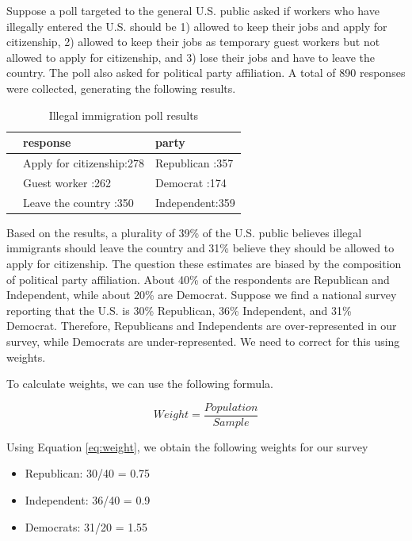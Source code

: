 \documentclass[
]{book}
\providecommand{\tightlist}{%
  \setlength{\itemsep}{0pt}\setlength{\parskip}{0pt}}
\begin{document}
Suppose a poll targeted to the general U.S. public asked if workers who have illegally entered the U.S. should be 1) allowed to keep their jobs and apply for citizenship, 2) allowed to keep their jobs as temporary guest workers but not allowed to apply for citizenship, and 3) lose their jobs and have to leave the country. The poll also asked for political party affiliation. A total of 890 responses were collected, generating the following results.

\begin{table}

\caption{\label{tab:unnamed-chunk-271}Illegal immigration poll results}
\centering
\begin{tabular}[t]{l|l|l}
\hline
  &                  response &         party\\
\hline
 & Apply for citizenship:278 & Republican :357\\
\hline
 & Guest worker         :262 & Democrat   :174\\
\hline
 & Leave the country    :350 & Independent:359\\
\hline
\end{tabular}
\end{table}

Based on the results, a plurality of 39\% of the U.S. public believes illegal immigrants should leave the country and 31\% believe they should be allowed to apply for citizenship. The question these estimates are biased by the composition of political party affiliation. About 40\% of the respondents are Republican and Independent, while about 20\% are Democrat. Suppose we find a national survey reporting that the U.S. is 30\% Republican, 36\% Independent, and 31\% Democrat. Therefore, Republicans and Independents are over-represented in our survey, while Democrats are under-represented. We need to correct for this using weights.

To calculate weights, we can use the following formula.

\begin{equation}
Weight = \frac{Population}{Sample}
\label{eq:weight}
\end{equation}

Using Equation \eqref{eq:weight}, we obtain the following weights for our survey

\begin{itemize}
\tightlist
\item
  Republican: 30/40 = 0.75
\item
  Independent: 36/40 = 0.9
\item
  Democrats: 31/20 = 1.55
\end{itemize}
\end{document}
